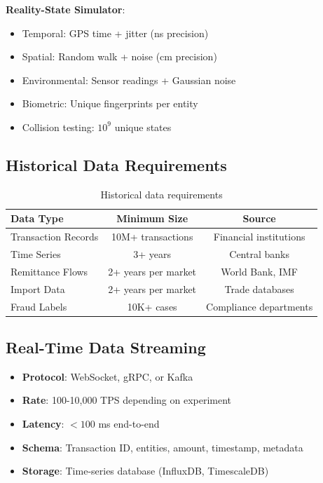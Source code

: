 \documentclass[12pt]{article}
\begin{document}
\textbf{Reality-State Simulator}:
\begin{itemize}
    \item Temporal: GPS time + jitter (ns precision)
    \item Spatial: Random walk + noise (cm precision)
    \item Environmental: Sensor readings + Gaussian noise
    \item Biometric: Unique fingerprints per entity
    \item Collision testing: $10^9$ unique states
\end{itemize}

\subsection{Historical Data Requirements}

\begin{table}[h]
\centering
\begin{tabular}{|l|c|c|}
\hline
Data Type & Minimum Size & Source \\
\hline
Transaction Records & 10M+ transactions & Financial institutions \\
Time Series & 3+ years & Central banks \\
Remittance Flows & 2+ years per market & World Bank, IMF \\
Import Data & 2+ years per market & Trade databases \\
Fraud Labels & 10K+ cases & Compliance departments \\
\hline
\end{tabular}
\caption{Historical data requirements}
\end{table}

\subsection{Real-Time Data Streaming}

\begin{itemize}
    \item \textbf{Protocol}: WebSocket, gRPC, or Kafka
    \item \textbf{Rate}: 100-10,000 TPS depending on experiment
    \item \textbf{Latency}: $< 100$ ms end-to-end
    \item \textbf{Schema}: Transaction ID, entities, amount, timestamp, metadata
    \item \textbf{Storage}: Time-series database (InfluxDB, TimescaleDB)
\end{itemize}
\end{document}
